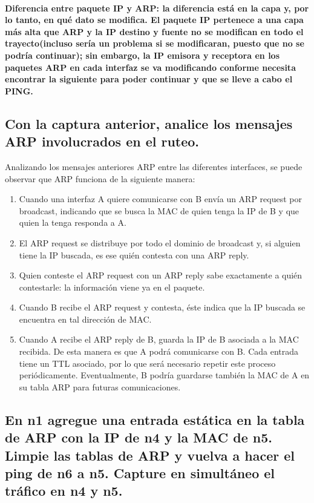 \documentclass[a4paper,11pt]{article} %
\begin{document}
\paragraph{\textbf{Diferencia entre paquete IP y ARP}: la diferencia está en la capa y, por lo tanto, en qué dato se modifica. El paquete IP pertenece a una capa más alta que ARP y la IP destino y fuente no se modifican en todo el trayecto(incluso sería un problema si se modificaran, puesto que no se podría continuar); sin embargo, la IP emisora y receptora en los paquetes ARP en cada interfaz se va modificando conforme necesita encontrar la siguiente para poder continuar y que se lleve a cabo el PING.}

\subsection{Con la captura anterior, analice los mensajes ARP involucrados en el ruteo.}

    Analizando los mensajes anteriores ARP entre las diferentes interfaces, se puede observar que ARP funciona de la siguiente manera:

    \begin{enumerate}[leftmargin=2cm]
        \item Cuando una interfaz A quiere comunicarse con B envía un ARP request por broadcast, indicando que se busca la MAC de quien tenga la IP de B y que quien la tenga responda a A.
        \item El ARP request se distribuye por todo el dominio de broadcast y, si alguien tiene la IP buscada, es ese quién contesta con una ARP reply.
        \item Quien conteste el ARP request con un ARP reply sabe exactamente a quién contestarle: la información viene ya en el paquete.
        \item Cuando B recibe el ARP request y contesta, éste indica que la IP buscada se encuentra en tal dirección de MAC.
        \item Cuando A recibe el ARP reply de B, guarda la IP de B asociada a la MAC recibida. De esta manera es que A podrá comunicarse con B. Cada entrada tiene un TTL asociado, por lo que será necesario repetir este proceso periódicamente. Eventualmente, B podría guardarse también la MAC de A en su tabla ARP para futuras comunicaciones.
    \end{enumerate}

\subsection{En n1 agregue una entrada estática en la tabla de ARP con la IP de n4 y la MAC de n5. Limpie las tablas de ARP y vuelva a hacer el ping de n6 a n5. Capture en simultáneo el tráfico en n4 y n5.}
\end{document}
